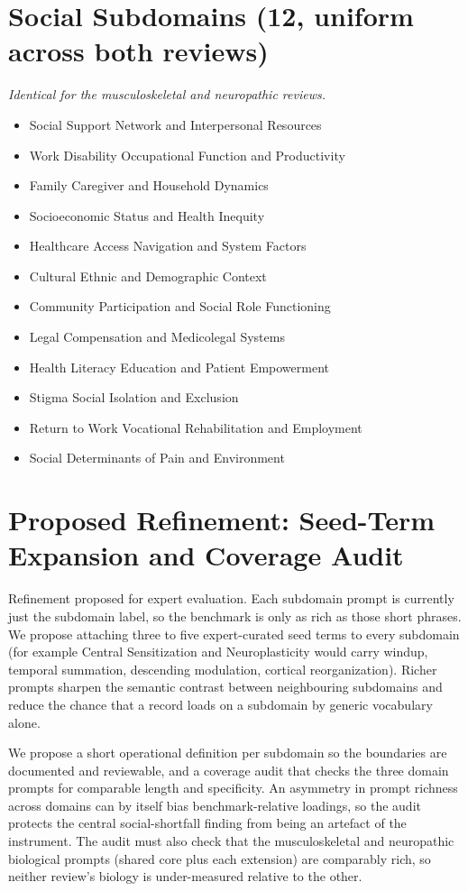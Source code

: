 \documentclass[11pt]{article}
\begin{document}
\section*{Social Subdomains (12, uniform across both reviews)}
{\small\itshape Identical for the musculoskeletal and neuropathic reviews.}\par\smallskip
\begin{itemize}
\item Social Support Network and Interpersonal Resources
\item Work Disability Occupational Function and Productivity
\item Family Caregiver and Household Dynamics
\item Socioeconomic Status and Health Inequity
\item Healthcare Access Navigation and System Factors
\item Cultural Ethnic and Demographic Context
\item Community Participation and Social Role Functioning
\item Legal Compensation and Medicolegal Systems
\item Health Literacy Education and Patient Empowerment
\item Stigma Social Isolation and Exclusion
\item Return to Work Vocational Rehabilitation and Employment
\item Social Determinants of Pain and Environment
\end{itemize}

\section*{Proposed Refinement: Seed-Term Expansion and Coverage Audit}
Refinement proposed for expert evaluation. Each subdomain prompt is currently just the subdomain label, so the benchmark is only as rich as those short phrases. We propose attaching three to five expert-curated seed terms to every subdomain (for example Central Sensitization and Neuroplasticity would carry windup, temporal summation, descending modulation, cortical reorganization). Richer prompts sharpen the semantic contrast between neighbouring subdomains and reduce the chance that a record loads on a subdomain by generic vocabulary alone.

We propose a short operational definition per subdomain so the boundaries are documented and reviewable, and a coverage audit that checks the three domain prompts for comparable length and specificity. An asymmetry in prompt richness across domains can by itself bias benchmark-relative loadings, so the audit protects the central social-shortfall finding from being an artefact of the instrument. The audit must also check that the musculoskeletal and neuropathic biological prompts (shared core plus each extension) are comparably rich, so neither review's biology is under-measured relative to the other.
\end{document}
